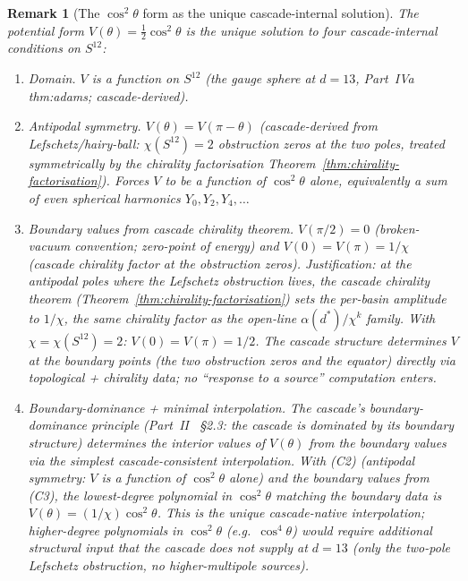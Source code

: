 \documentclass[12pt,a4paper]{article}
\newtheorem*{remark}{Remark}
\begin{document}
\begin{remark}[The $\cos^2\theta$ form as the unique cascade-internal solution]\label{rem:V-cos2-derivation}
The potential form $V(\theta) = \tfrac{1}{2}\cos^2\theta$ is the unique solution to four cascade-internal conditions on $S^{12}$:
\begin{enumerate}[label=(C\arabic*),nosep]
\item \emph{Domain.} $V$ is a function on $S^{12}$ (the gauge sphere at $d=13$, Part~IVa~\cite{part4a} \emph{thm:adams}; cascade-derived).
\item \emph{Antipodal symmetry.} $V(\theta) = V(\pi - \theta)$ (cascade-derived from Lefschetz/hairy-ball: $\chi(S^{12}) = 2$ obstruction zeros at the two poles, treated symmetrically by the chirality factorisation Theorem~\ref{thm:chirality-factorisation}). Forces $V$ to be a function of $\cos^2\theta$ alone, equivalently a sum of even spherical harmonics $Y_0, Y_2, Y_4, \ldots$
\item \emph{Boundary values from cascade chirality theorem.} $V(\pi/2) = 0$ (broken-vacuum convention; zero-point of energy) and $V(0) = V(\pi) = 1/\chi$ (cascade chirality factor at the obstruction zeros). Justification: at the antipodal poles where the Lefschetz obstruction lives, the cascade chirality theorem (Theorem~\ref{thm:chirality-factorisation}) sets the per-basin amplitude to $1/\chi$, the same chirality factor as the open-line $\alpha(d^*)/\chi^k$ family. With $\chi = \chi(S^{12}) = 2$: $V(0) = V(\pi) = 1/2$. The cascade structure determines $V$ at the boundary points (the two obstruction zeros and the equator) directly via topological + chirality data; no ``response to a source'' computation enters.
\item \emph{Boundary-dominance + minimal interpolation.} The cascade's boundary-dominance principle (Part~II~\cite{part2} \S2.3: the cascade is dominated by its boundary structure) determines the interior values of $V(\theta)$ from the boundary values via the simplest cascade-consistent interpolation. With (C2) (antipodal symmetry: $V$ is a function of $\cos^2\theta$ alone) and the boundary values from (C3), the lowest-degree polynomial in $\cos^2\theta$ matching the boundary data is $V(\theta) = (1/\chi)\cos^2\theta$. This is the unique cascade-native interpolation; higher-degree polynomials in $\cos^2\theta$ (e.g.\ $\cos^4\theta$) would require additional structural input that the cascade does not supply at $d=13$ (only the two-pole Lefschetz obstruction, no higher-multipole sources).
\end{enumerate}


\end{remark}
\end{document}
